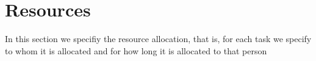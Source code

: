 \section{Resources} %
\label{sec:resources}

In this section we specifiy the resource allocation, that is, for each task we specify to whom it is allocated and for how long it is allocated to that person

